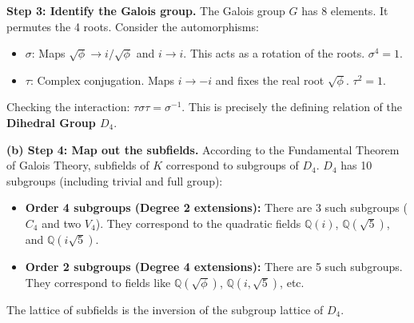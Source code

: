 \begin{solution}
\textbf{Step 3: Identify the Galois group.}
The Galois group $G$ has 8 elements. It permutes the 4 roots.
Consider the automorphisms:
\begin{itemize}
    \item $\sigma$: Maps $\sqrt{\phi} \to i/\sqrt{\phi}$ and $i \to i$. This acts as a rotation of the roots. $\sigma^4 = 1$.
    \item $\tau$: Complex conjugation. Maps $i \to -i$ and fixes the real root $\sqrt{\phi}$. $\tau^2 = 1$.
\end{itemize}
Checking the interaction: $\tau \sigma \tau = \sigma^{-1}$.
This is precisely the defining relation of the \textbf{Dihedral Group $D_4$}.

\textbf{(b) Step 4: Map out the subfields.}
According to the Fundamental Theorem of Galois Theory, subfields of $K$ correspond to subgroups of $D_4$.
$D_4$ has 10 subgroups (including trivial and full group):
\begin{itemize}
    \item \textbf{Order 4 subgroups (Degree 2 extensions):} There are 3 such subgroups ($C_4$ and two $V_4$). They correspond to the quadratic fields $\mathbb{Q}(i)$, $\mathbb{Q}(\sqrt{5})$, and $\mathbb{Q}(i\sqrt{5})$.
    \item \textbf{Order 2 subgroups (Degree 4 extensions):} There are 5 such subgroups. They correspond to fields like $\mathbb{Q}(\sqrt{\phi})$, $\mathbb{Q}(i, \sqrt{5})$, etc.
\end{itemize}
The lattice of subfields is the inversion of the subgroup lattice of $D_4$.
\end{solution}

